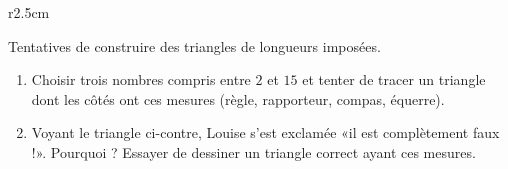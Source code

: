 


\begin{wrapfigure}{r}{2.5cm}
   \vspace{-0.5cm}        %
   \centering
   
\end{wrapfigure}

Tentatives de construire des triangles de longueurs imposées.

\begin{enumerate}
    \item
        
Choisir trois nombres compris entre $2$ et $15$ et tenter de tracer un triangle dont les côtés ont ces mesures (règle, rapporteur, compas, équerre).

\item

    Voyant le triangle ci-contre, Louise s'est exclamée «il est complètement faux !». Pourquoi ? Essayer de dessiner un triangle correct ayant ces mesures.

\end{enumerate}
